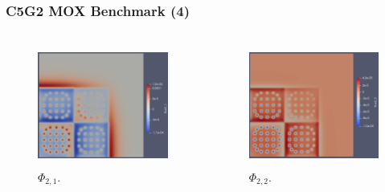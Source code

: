 \begin{frame}
\frametitle{C5G2 MOX Benchmark (4)}
\begin{columns}
    \column[t]{5cm}
	\begin{figure}[htbp!]
		\begin{center}
			\includegraphics[height=4cm]{figures/flux2_1}
		\end{center}
		\caption{$\Phi_{2, 1}$.}
	\end{figure}

	\column[t]{5cm}
	\begin{figure}[htbp!]
		\begin{center}
			\includegraphics[height=4cm]{figures/flux2_2}
		\end{center}
		\caption{$\Phi_{2, 2}$.}
	\end{figure}
\end{columns}
\end{frame}
